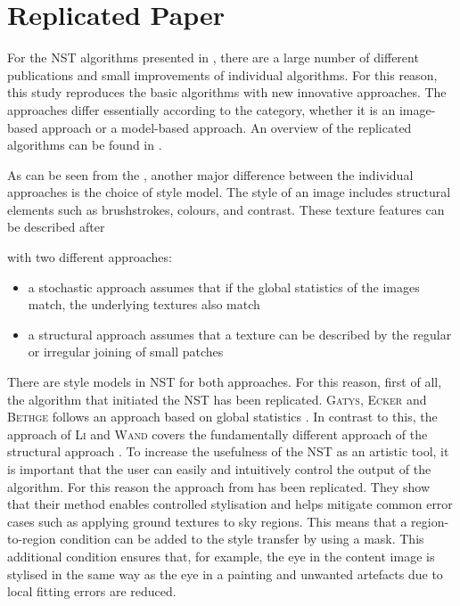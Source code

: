 \section{Replicated Paper} \label{sec:replicated_paper}
For the \gls{NST} algorithms presented in , there are a large number of different publications and small improvements of individual algorithms. For this reason, this study reproduces the basic algorithms with new innovative approaches. The approaches differ essentially according to the category, whether it is an image-based approach or a model-based approach. An overview of the replicated algorithms can be found in . 

As can be seen from the , another major difference between the individual approaches is the choice of style model. The style of an image includes structural elements such as brushstrokes, colours, and contrast. These texture features can be described after \author{Zhou} \cite{Zho2006} with two different approaches:
\begin{itemize}
	\item a stochastic approach assumes that if the global statistics of the images match, the underlying textures also match
	\item a structural approach assumes that a texture can be described by the regular or irregular joining of small patches
\end{itemize}

There are style models in \gls{NST} for both approaches. For this reason, first of all, the algorithm that initiated the \gls{NST} has been replicated. \textsc{Gatys}, \textsc{Ecker} and \textsc{Bethge} follows an approach based on global statistics \cite{GEB2016}. In contrast to this, the approach of \textsc{Li} and \textsc{Wand} covers the fundamentally different approach of the structural approach \cite{LW2016}. To increase the usefulness of the \gls{NST} as an artistic tool, it is important that the user can easily and intuitively control the output of the algorithm. For this reason the approach from  \cite{GEB+2017} has been replicated. They show that their method enables controlled stylisation and helps mitigate common error cases such as applying ground textures to sky regions. This means that a region-to-region condition can be added to the style transfer by using a mask. This additional condition ensures that, for example, the eye in the content image is stylised in the same way as the eye in a painting and unwanted artefacts due to local fitting errors are reduced.

